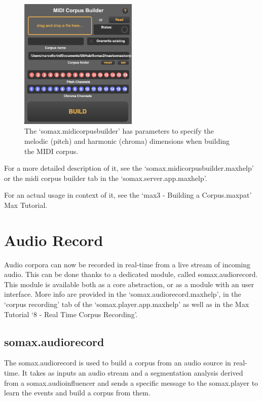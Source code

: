  \begin{figure}[H]
    \centering        
 	\includegraphics[width=0.5\textwidth, keepaspectratio]{img/midicorpusbuilder.png}
    \caption{The `somax.midicorpusbuilder' has parameters to specify the melodic (pitch) and harmonic (chroma) dimensions when building the MIDI corpus.}
    \label{fig:midicorpusbuilder}
\end{figure}

For a more detailed description of it, see the `somax.midicorpusbuilder.maxhelp' or the midi corpus builder tab in the `somax.server.app.maxhelp'.

For an actual usage in context of it, see the `max3 - Building a Corpus.maxpat' Max Tutorial.


\section{Audio Record}

Audio corpora can now be recorded in real-time from a live stream of incoming audio.
This can be done thanks to a dedicated module, called somax.audiorecord.
This module is available both as a core abstraction, or as a module with an user interface.
More info are provided in the `somax.audiorecord.maxhelp', in the `corpus recording' tab of the `somax.player.app.maxhelp' as well as in the Max Tutorial `8 - Real Time Corpus Recording'. 

\subsection{somax.audiorecord}

The somax.audiorecord is used to build a corpus from an audio source in real-time. It takes as inputs an audio stream and a segmentation analysis derived from a somax.audioinfluencer and sends a specific message to the somax.player to learn the events and build a corpus from them.

